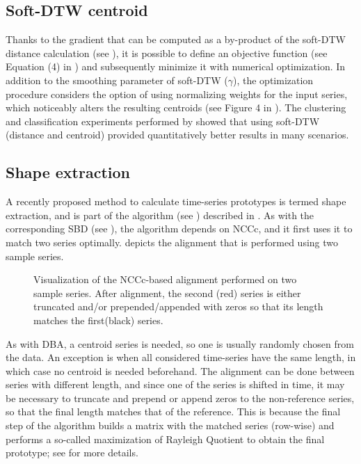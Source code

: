 \subsection{Soft-DTW centroid}
\label{sec:sdtw-cent}

Thanks to the gradient that can be computed as a by-product of the soft-DTW distance calculation
(see ),
it is possible to define an objective function
(see Equation (4) in \citet{cuturi2017})
and subsequently minimize it with numerical optimization.
In addition to the smoothing parameter of soft-DTW ($\gamma$),
the optimization procedure considers the option of using normalizing weights for the input series,
which noticeably alters the resulting centroids
(see Figure 4 in \citet{cuturi2017}).
The clustering and classification experiments performed by \citet{cuturi2017} showed that using soft-DTW (distance and centroid) provided quantitatively better results in many scenarios.

\subsection{Shape extraction}
\label{sec:shape}

A recently proposed method to calculate time-series prototypes is termed shape extraction,
and is part of the \kshape{} algorithm (see ) described in \citet{paparrizos2015}.
As with the corresponding SBD (see ),
the algorithm depends on NCCc,
and it first uses it to match two series optimally.
 depicts the alignment that is performed using two sample series.

\begin{figure}[htbp]

{\centering {}

}

\caption{Visualization of the NCCc-based alignment performed on two sample series. After alignment, the second (red) series is either truncated and/or prepended/appended with zeros so that its length matches the first(black) series.}\label{fig:sbd-alignment}
\end{figure}

As with DBA, a centroid series is needed,
so one is usually randomly chosen from the data.
An exception is when all considered time-series have the same length,
in which case no centroid is needed beforehand.
The alignment can be done between series with different length,
and since one of the series is shifted in time,
it may be necessary to truncate and prepend or append zeros to the non-reference series,
so that the final length matches that of the reference.
This is because the final step of the algorithm builds a matrix with the matched series (row-wise) and performs a so-called maximization of Rayleigh Quotient to obtain the final prototype;
see \citet{paparrizos2015} for more details.

